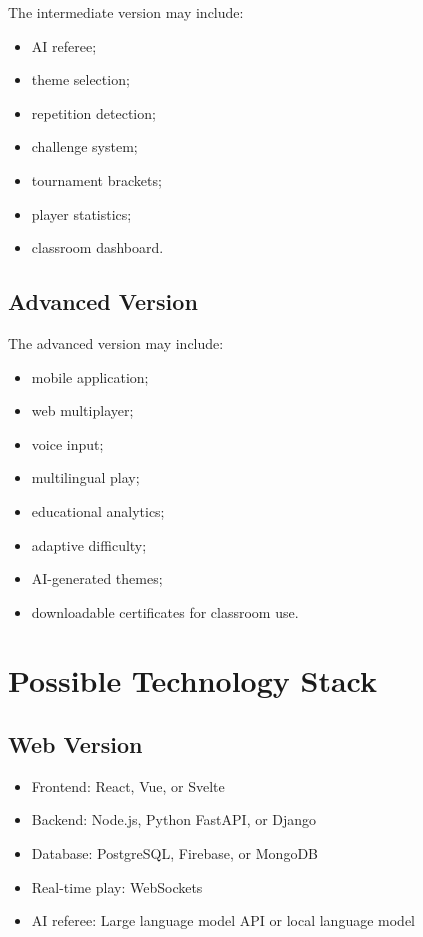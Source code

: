 \documentclass[11pt,a4paper]{article}
\begin{document}
The intermediate version may include:

\begin{itemize}
    \item AI referee;
    \item theme selection;
    \item repetition detection;
    \item challenge system;
    \item tournament brackets;
    \item player statistics;
    \item classroom dashboard.
\end{itemize}

\subsection{Advanced Version}

The advanced version may include:

\begin{itemize}
    \item mobile application;
    \item web multiplayer;
    \item voice input;
    \item multilingual play;
    \item educational analytics;
    \item adaptive difficulty;
    \item AI-generated themes;
    \item downloadable certificates for classroom use.
\end{itemize}

\section{Possible Technology Stack}

\subsection{Web Version}

\begin{itemize}
    \item Frontend: React, Vue, or Svelte
    \item Backend: Node.js, Python FastAPI, or Django
    \item Database: PostgreSQL, Firebase, or MongoDB
    \item Real-time play: WebSockets
    \item AI referee: Large language model API or local language model
\end{itemize}
\end{document}
